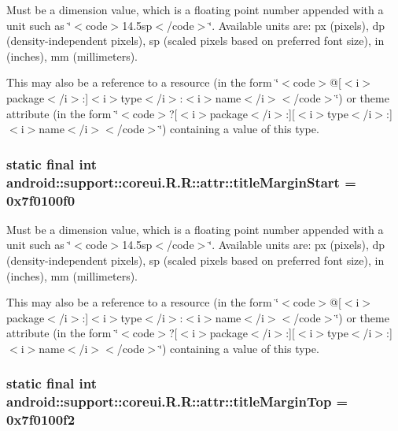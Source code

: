 Must be a dimension value, which is a floating point number appended with a unit such as \char`\"{}$<$code$>$14.5sp$<$/code$>$\char`\"{}. Available units are: px (pixels), dp (density-independent pixels), sp (scaled pixels based on preferred font size), in (inches), mm (millimeters). 

This may also be a reference to a resource (in the form \char`\"{}$<$code$>$@\mbox{[}$<$i$>$package$<$/i$>$:\mbox{]}$<$i$>$type$<$/i$>$:$<$i$>$name$<$/i$>$$<$/code$>$\char`\"{}) or theme attribute (in the form \char`\"{}$<$code$>$?\mbox{[}$<$i$>$package$<$/i$>$:\mbox{]}\mbox{[}$<$i$>$type$<$/i$>$:\mbox{]}$<$i$>$name$<$/i$>$$<$/code$>$\char`\"{}) containing a value of this type. \hypertarget{classandroid_1_1support_1_1coreui_1_1_r_1_1attr_da3eb6b590fc2d0749cd707f40765c71}{
\subsubsection[{titleMarginStart}]{\setlength{\rightskip}{0pt plus 5cm}static final int android::support::coreui.R.R::attr::titleMarginStart = 0x7f0100f0}}
\label{classandroid_1_1support_1_1coreui_1_1_r_1_1attr_da3eb6b590fc2d0749cd707f40765c71}


Must be a dimension value, which is a floating point number appended with a unit such as \char`\"{}$<$code$>$14.5sp$<$/code$>$\char`\"{}. Available units are: px (pixels), dp (density-independent pixels), sp (scaled pixels based on preferred font size), in (inches), mm (millimeters). 

This may also be a reference to a resource (in the form \char`\"{}$<$code$>$@\mbox{[}$<$i$>$package$<$/i$>$:\mbox{]}$<$i$>$type$<$/i$>$:$<$i$>$name$<$/i$>$$<$/code$>$\char`\"{}) or theme attribute (in the form \char`\"{}$<$code$>$?\mbox{[}$<$i$>$package$<$/i$>$:\mbox{]}\mbox{[}$<$i$>$type$<$/i$>$:\mbox{]}$<$i$>$name$<$/i$>$$<$/code$>$\char`\"{}) containing a value of this type. \hypertarget{classandroid_1_1support_1_1coreui_1_1_r_1_1attr_25774c08bede1158a573632a5f7cf854}{
\subsubsection[{titleMarginTop}]{\setlength{\rightskip}{0pt plus 5cm}static final int android::support::coreui.R.R::attr::titleMarginTop = 0x7f0100f2}}
\label{classandroid_1_1support_1_1coreui_1_1_r_1_1attr_25774c08bede1158a573632a5f7cf854}


